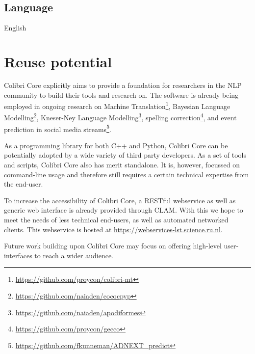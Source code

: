 \documentclass[a4paper,12pt]{article}
\begin{document}
\subsection{Language}

English

\section{Reuse potential}

Colibri Core explicitly aims to provide a foundation for researchers in the NLP
community to build their tools and research on. The software is already being
employed in ongoing research on Machine
Translation\footnote{\url{https://github.com/proycon/colibri-mt}}, Bayesian Language
Modelling\footnote{\url{https://github.com/naiaden/cococpyp}}, Kneser-Ney Language
Modelling\footnote{\url{https://github.com/naiaden/apodiformes}}, spelling
correction\footnote{\url{https://github.com/proycon/gecco}}, and event
prediction in social media streams\footnote{\url{https://github.com/fkunneman/ADNEXT\_predict}}.

As a programming library for both C++ and Python, Colibri Core can be
potentially adopted by a wide variety of third party developers. As a set of
tools and scripts, Colibri Core also has merit standalone. It is, however,
focussed on command-line usage and therefore still requires a certain technical
expertise from the end-user.

To increase the accessibility of Colibri Core, a RESTful webservice as well as
generic web interface is already provided through CLAM\cite{CLAMPAPER}. With this we
hope to meet the needs of less technical end-users, as well as automated
networked clients. This webservice is hosted at
\url{https://webservices-lst.science.ru.nl}.

Future work building upon Colibri Core may focus on offering 
high-level user-interfaces to reach a wider audience.



\end{document}
